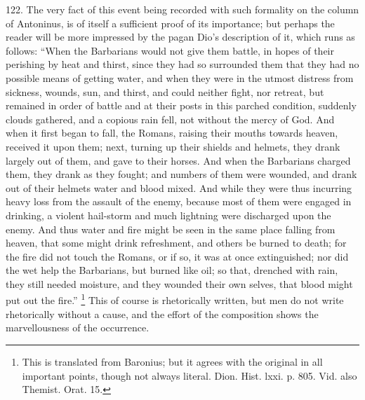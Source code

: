 122.
The very fact of this event being recorded with such formality on the
column of Antoninus, is of itself a sufficient proof of its
importance; but perhaps the reader will be more impressed by the pagan
Dio's description of it, which runs as follows: ``When the Barbarians
would not give them battle, in hopes of their perishing by heat and
thirst, since they had so surrounded them that they had no possible
means of getting water, and when they were in the utmost distress from
sickness, wounds, sun, and thirst, and could neither fight, nor
retreat, but remained in order of battle and at their posts in this
parched condition, suddenly clouds gathered, and a copious rain fell,
not without the mercy of God. And when it first began to fall, the
Romans, raising their mouths towards heaven, received it upon them;
next, turning up their shields and helmets, they drank largely out of
them, and gave to their horses. And when the Barbarians charged
them, they drank as they fought; and numbers of them were wounded, and
drank out of their helmets water and blood mixed. And while they were
thus incurring heavy loss from the assault of the enemy, because most
of them were engaged in drinking, a violent hail-storm and much
lightning were discharged upon the enemy. And thus water and fire
might be seen in the same place falling from heaven, that some might
drink refreshment, and others be burned to death; for the fire did not
touch the Romans, or if so, it was at once extinguished; nor did the
wet help the Barbarians, but burned like oil; so that, drenched with
rain, they still needed moisture, and they wounded their own selves,
that blood might put out the fire.'' \footnote{This is translated from Baronius; but it agrees with the original in
all important points, though not always literal. Dion. Hist. lxxi. p.
805. Vid. also Themist. Orat. 15.} This of course is rhetorically written, but men do not write
rhetorically without a cause, and the effort of the composition shows
the marvellousness of the occurrence.


